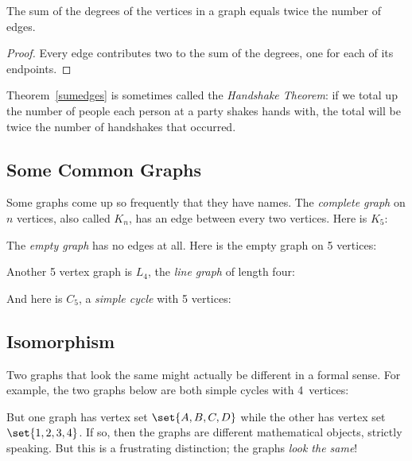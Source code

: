 \begin{theorem}\label{sumedges}
The sum of the degrees of the vertices in a graph equals twice the number
of edges.
\end{theorem}

\begin{proof}
Every edge contributes two to the sum of the degrees, one for each of its
endpoints.
\end{proof}

Theorem~\ref{sumedges} is sometimes called the \emph{Handshake Theorem}:
if we total up the number of people each person at a party shakes hands
with, the total will be twice the number of handshakes that occurred.

\subsection{Some Common Graphs}

Some graphs come up so frequently that they have names.  The {\em complete
graph} on $n$ vertices, also called $K_n$, has an edge between every two
vertices.  Here is $K_5$:


The {\em empty graph} has no edges at all.  Here is the
empty graph on 5 vertices:


Another 5 vertex graph is $L_4$, the \emph{line graph} of length four:


And here is $C_5$, a \emph{simple cycle} with 5 vertices:


\subsection{Isomorphism}

Two graphs that look the same might actually be different in a formal
sense.  For example, the two graphs below are both simple cycles with
4~vertices:


But one graph has vertex set $\set{A, B, C, D}$ while the
other has vertex set $\set{1, 2, 3, 4}$.  If so, then the graphs are
different mathematical objects, strictly speaking.  But this is a
frustrating distinction; the graphs {\em look the same}!


